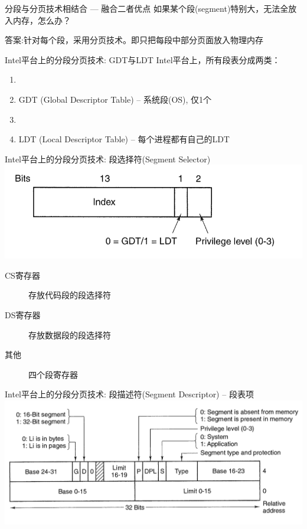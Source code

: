 \documentclass[xcolor=svgnames]{beamer}
\begin{document}
\begin{CJK*}{UTF8}{gbsn}
\begin{frame}{分段与分页技术相结合 --- 融合二者优点}
如果某个段(segment)特别大，无法全放入内存，怎么办？

\alert{答案}:针对每个段，采用分页技术。即只把每段中部分页面放入物理内存
\end{frame}

\begin{frame}{Intel平台上的分段分页技术: GDT与LDT}
Intel平台上，所有段表分成两类：
\begin{enumerate}
\item[]
\item GDT (Global Descriptor Table) -- 系统段(OS), 仅1个
\item[]
\item LDT (Local Descriptor Table) -- 每个进程都有自己的LDT
\end{enumerate}
\end{frame}

\begin{frame}{Intel平台上的分段分页技术: 段选择符(Segment Selector)}
\includegraphics[width=1.0\textwidth]{selector.png}

\begin{description}
\item[CS寄存器] 存放代码段的段选择符
\item[DS寄存器] 存放数据段的段选择符
\item[其他] 四个段寄存器
\end{description}
\end{frame}

\begin{frame}{Intel平台上的分段分页技术: 段描述符(Segment Descriptor) -- 段表项}
\includegraphics[width=1.0\textwidth]{descriptor.png}


\end{frame}
\end{CJK*}
\end{document}
